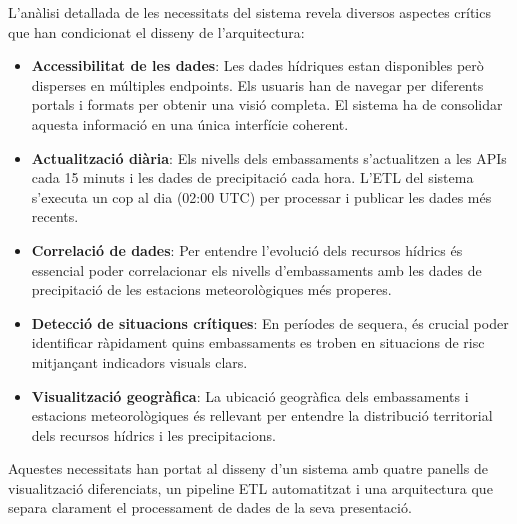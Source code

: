 L'anàlisi detallada de les necessitats del sistema revela diversos aspectes crítics que han condicionat el disseny de l'arquitectura:

\begin{itemize}
    \item \textbf{Accessibilitat de les dades}: Les dades hídriques estan disponibles però disperses en múltiples endpoints. Els usuaris han de navegar per diferents portals i formats per obtenir una visió completa. El sistema ha de consolidar aquesta informació en una única interfície coherent.
    
    \item \textbf{Actualització diària}: Els nivells dels embassaments s'actualitzen a les APIs cada 15 minuts i les dades de precipitació cada hora. L'ETL del sistema s'executa un cop al dia (02:00 UTC) per processar i publicar les dades més recents.
    
    \item \textbf{Correlació de dades}: Per entendre l'evolució dels recursos hídrics és essencial poder correlacionar els nivells d'embassaments amb les dades de precipitació de les estacions meteorològiques més properes.
    
    \item \textbf{Detecció de situacions crítiques}: En períodes de sequera, és crucial poder identificar ràpidament quins embassaments es troben en situacions de risc mitjançant indicadors visuals clars.
    
    \item \textbf{Visualització geogràfica}: La ubicació geogràfica dels embassaments i estacions meteorològiques és rellevant per entendre la distribució territorial dels recursos hídrics i les precipitacions.
\end{itemize}

Aquestes necessitats han portat al disseny d'un sistema amb quatre panells de visualització diferenciats, un pipeline ETL automatitzat i una arquitectura que separa clarament el processament de dades de la seva presentació.

